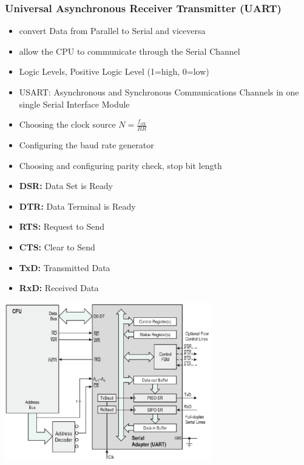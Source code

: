 \subsubsection{Universal Asynchronous Receiver Transmitter (\acs{UART})}
\begin{minipage}{10cm}
	\begin{itemize}
		\item convert Data from Parallel to Serial and viceversa
		\item allow the \acs{CPU} to communicate through the Serial Channel
		\item Logic Levels, Positive Logic Level (1=high, 0=low)
		\item \acs{USART}: Asynchronous and Synchronous Communications Channels in one single Serial Interface Module
		\item Choosing the clock source $N=\frac{f_{clk}}{BR}$
		\item Configuring the baud rate generator
		\item Choosing and configuring parity check, stop bit length
		\item \textbf{\acs{DSR}: }Data Set is Ready
		\item \textbf{\acs{DTR}: }Data Terminal is Ready
		\item \textbf{\acs{RTS}: }Request to Send
		\item \textbf{\acs{CTS}: }Clear to Send
		\item \textbf{\acs{TxD}: }Transmitted Data
		\item \textbf{\acs{RxD}: }Received Data
	\end{itemize}
\end{minipage}
\begin{minipage}{9cm}
	\includegraphics[width=9cm]{images/uart.png}
\end{minipage}

